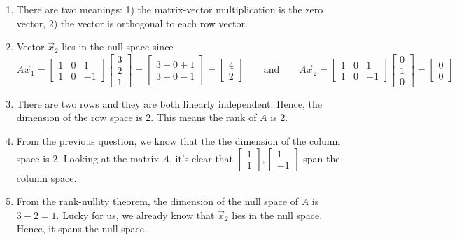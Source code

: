 \documentclass[11pt]{article}
\begin{document}
\begin{enumerate}
    \item[(a)] There are two meanings: 1) the matrix-vector multiplication is the zero vector, 2) the vector is orthogonal to each row vector.
    \item[(b)] Vector $\vec{x}_2$ lies in the null space since \[ A\vec{x}_1 = \begin{bmatrix}
    1 & 0 & 1\\ 1 & 0 & -1
\end{bmatrix}\begin{bmatrix} 3 \\ 2 \\ 1\end{bmatrix} = \begin{bmatrix} 3 + 0 +  1\\ 3 + 0 -1 \end{bmatrix} = \begin{bmatrix} 4\\ 2 \end{bmatrix}\qquad \text{and}\qquad A\vec{x}_2 = \begin{bmatrix}
    1 & 0 & 1\\ 1 & 0 & -1
\end{bmatrix}\begin{bmatrix} 0\\ 1 \\ 0\end{bmatrix} = \begin{bmatrix} 0 \\ 0 \end{bmatrix} \]
    \item[(c)] There are two rows and they are both linearly independent. Hence, the dimension of the row space is 2. This means the rank of $A$ is 2.
    \item[(d)] From the previous question, we know that the the dimension of the column space is 2. Looking at the matrix $A$, it's clear that $\begin{bmatrix} 1\\1 \end{bmatrix},\begin{bmatrix} 1\\-1 \end{bmatrix}$ span the column space.
    \item[(e)] From the rank-nullity theorem, the dimension of the null space of $A$ is $3-2=1$. Lucky for us, we already know that $\vec{x}_2$ lies in the null space. Hence, it spans the null space.

\end{enumerate}
\end{document}
